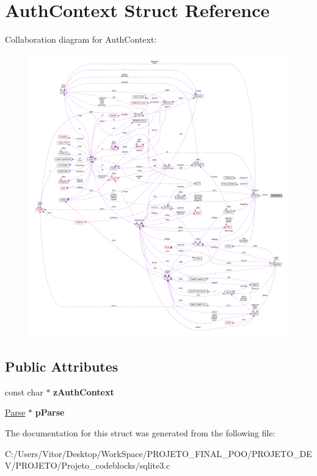 \hypertarget{struct_auth_context}{\section{Auth\-Context Struct Reference}
\label{struct_auth_context}
}


Collaboration diagram for Auth\-Context\-:\nopagebreak
\begin{figure}[H]
\begin{center}
\leavevmode
\includegraphics[width=350pt]{struct_auth_context__coll__graph}
\end{center}
\end{figure}
\subsection*{Public Attributes}
\begin{DoxyCompactItemize}
\item 
\hypertarget{struct_auth_context_a1b095b152b72326476ac3f7edcaee78a}{const char $\ast$ {\bfseries z\-Auth\-Context}}\label{struct_auth_context_a1b095b152b72326476ac3f7edcaee78a}

\item 
\hypertarget{struct_auth_context_a8df2931d8f4facf59073c92315b00bfa}{\hyperlink{struct_parse}{Parse} $\ast$ {\bfseries p\-Parse}}\label{struct_auth_context_a8df2931d8f4facf59073c92315b00bfa}

\end{DoxyCompactItemize}


The documentation for this struct was generated from the following file\-:\begin{DoxyCompactItemize}
\item 
C\-:/\-Users/\-Vitor/\-Desktop/\-Work\-Space/\-P\-R\-O\-J\-E\-T\-O\-\_\-\-F\-I\-N\-A\-L\-\_\-\-P\-O\-O/\-P\-R\-O\-J\-E\-T\-O\-\_\-\-D\-E\-V/\-P\-R\-O\-J\-E\-T\-O/\-Projeto\-\_\-codeblocks/sqlite3.\-c\end{DoxyCompactItemize}

